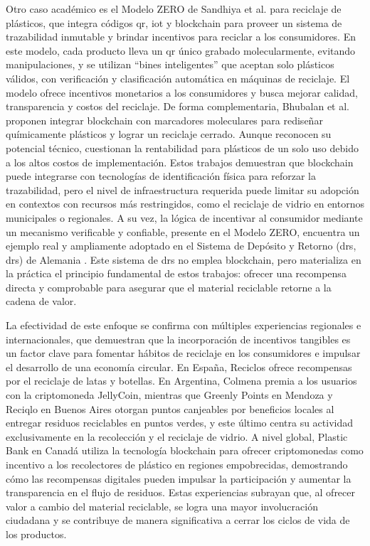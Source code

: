 Otro caso académico es el Modelo ZERO de Sandhiya et al. \cite{sandhiya2020investigating} para reciclaje de plásticos, que integra códigos \acrshort{qr}, \acrshort{iot} y blockchain para proveer un sistema de trazabilidad inmutable y brindar incentivos para reciclar a los consumidores. En este modelo, cada producto lleva un \acrshort{qr} único grabado molecularmente, evitando manipulaciones, y se utilizan ``bines inteligentes'' que aceptan solo plásticos válidos, con verificación y clasificación automática en máquinas de reciclaje. El modelo ofrece incentivos monetarios a los consumidores y busca mejorar calidad, transparencia y costos del reciclaje. De forma complementaria, Bhubalan et al. \cite{bhubalan2022blockchain} proponen integrar blockchain con marcadores moleculares para rediseñar químicamente plásticos y lograr un reciclaje cerrado. Aunque reconocen su potencial técnico, cuestionan la rentabilidad para plásticos de un solo uso debido a los altos costos de implementación. Estos trabajos demuestran que blockchain puede integrarse con tecnologías de identificación física para reforzar la trazabilidad, pero el nivel de infraestructura requerida puede limitar su adopción en contextos con recursos más restringidos, como el reciclaje de vidrio en entornos municipales o regionales. A su vez, la lógica de incentivar al consumidor mediante un mecanismo verificable y confiable, presente en el Modelo ZERO, encuentra un ejemplo real y ampliamente adoptado en el Sistema de Depósito y Retorno (\acrshort{drs}, \acrlong{drs})  de Alemania \cite{picuno2025potential}. Este sistema de \acrshort{drs} no emplea blockchain, pero materializa en la práctica el principio fundamental de estos trabajos: ofrecer una recompensa directa y comprobable para asegurar que el material reciclable retorne a la cadena de valor.

La efectividad de este enfoque se confirma con múltiples experiencias regionales e internacionales, que demuestran que la incorporación de incentivos tangibles es un factor clave para fomentar hábitos de reciclaje en los consumidores e impulsar el desarrollo de una economía circular. En España, Reciclos \cite{reciclos2024} ofrece recompensas por el reciclaje de latas y botellas. En Argentina, Colmena \cite{colmena2024} premia a los usuarios con la \gls{criptomoneda} JellyCoin, mientras que Greenly Points \cite{greenlypoints2024} en Mendoza y Reciqlo en Buenos Aires \cite{innovar2024vidrio} otorgan puntos canjeables por beneficios locales al entregar residuos reciclables en puntos verdes, y este último centra su actividad exclusivamente en la recolección y el reciclaje de vidrio. A nivel global, Plastic Bank en Canadá utiliza la tecnología blockchain para ofrecer criptomonedas como incentivo a los recolectores de plástico en regiones empobrecidas, demostrando cómo las recompensas digitales pueden impulsar la participación y aumentar la transparencia en el flujo de residuos. Estas experiencias subrayan que, al ofrecer valor a cambio del material reciclable, se logra una mayor involucración ciudadana y se contribuye de manera significativa a cerrar los ciclos de vida de los productos.

